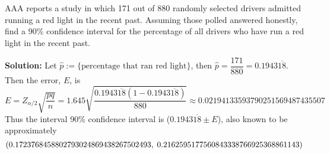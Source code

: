 \section{}
AAA reports a study in which 171 out of 880 randomly selected drivers admitted running a red light in the recent past.  Assuming those polled answered honestly, find a 90\% confidence interval for the percentage of all drivers who have run a red light in the recent past.
\begin{mybox}
\textbf{Solution: } Let $\hat{p} := \{\text{percentage that ran red light}\}$, then $\hat{p} = \dfrac{171}{880} = 0.1943\overline{18}$. Then the error, $E$, is
$$E = Z_{\alpha/2}\sqrt{\frac{pq}{n}}  = 1.645\sqrt{\frac{ 0.1943\overline{18}(1- 0.1943\overline{18})}{880} } \approx 0.02194133593790251569487435507$$
Thus the interval 90\% confidence interval is ($0.1943\overline{18} \pm E$), also known to be  approximately
$$\left( {0.1723768458802793024869438267502493,\;  0.2162595177560843338766925368861143} \right)$$
\end{mybox}